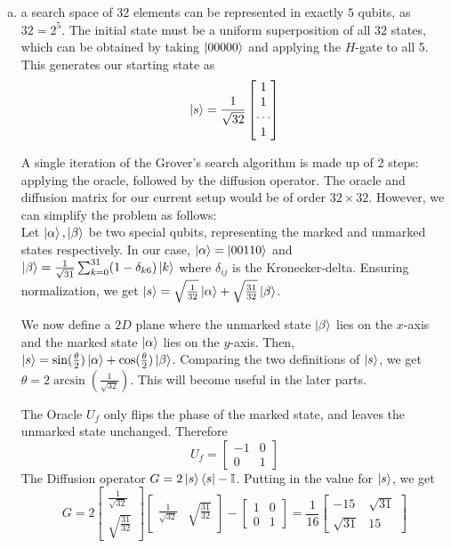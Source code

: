 \documentclass{article}
\begin{document}
\begin{enumerate}[(a)]
    \item
    a search space of $32$ elements can be represented in exactly $5$ qubits, as $32 = 2^5$. The initial state must be a uniform superposition of all $32$ states, which can be obtained by taking $\ket{00000}$ and applying the $H$-gate to all 5. This generates our starting state as
    \[
    \ket{s} = \frac{1}{\sqrt{32}}
              \begin{bmatrix}
                  1 \\
                  1 \\
                  \cdots \\
                  1
              \end{bmatrix}
    \]

    A single iteration of the Grover's search algorithm is made up of 2 steps: applying the oracle, followed by the diffusion operator. The oracle and diffusion matrix for our current setup would be of order $32 \times 32$. However, we can simplify the problem as follows: \\
    Let $\ket{\alpha}, \ket{\beta}$ be two special qubits, representing the marked and unmarked states respectively. In our case, $\ket{\alpha} = \ket{00110}$ and $\ket{\beta} = \frac{1}{\sqrt{31}} \sum_{k=0}^{31}(1 - \delta_{k6})\ket{k}$ where $\delta_{ij}$ is the Kronecker-delta. Ensuring normalization, we get $\ket{s} = \sqrt{\frac{1}{32}}\ket{\alpha} + \sqrt{\frac{31}{32}}\ket{\beta}$.

    We now define a $2D$ plane where the unmarked state $\ket{\beta}$ lies on the $x$-axis and the marked state $\ket{\alpha}$ lies on the $y$-axis. Then, $\ket{s} = \sin(\frac{\theta}{2})\ket{\alpha} + \cos(\frac{\theta}{2})\ket{\beta}$. Comparing the two definitions of $\ket{s}$, we get $\theta = 2\arcsin(\frac{1}{\sqrt{32}})$. This will become useful in the later parts.

    The Oracle $U_f$ only flips the phase of the marked state, and leaves the unmarked state unchanged. Therefore
    \[
    U_f = \begin{bmatrix}
        -1  &   0   \\
        0   &   1
    \end{bmatrix}
    \]
    The Diffusion operator $G = 2\ket{s}\bra{s} - \mathbb{I}$. Putting in the value for $\ket{s}$, we get
    \[
    G = 2 \begin{bmatrix}
        \frac{1}{\sqrt{32}} \\
        \sqrt{\frac{31}{32}}
    \end{bmatrix} \begin{bmatrix}
        \frac{1}{\sqrt{32}} &   \sqrt{\frac{31}{32}}
    \end{bmatrix} - \begin{bmatrix}
        1   &   0   \\
        0   &   1
    \end{bmatrix} = \frac{1}{16} \begin{bmatrix}
        -15 &   \sqrt{31}   \\
        \sqrt{31}   &   15
    \end{bmatrix}
    \]


\end{enumerate}
\end{document}
